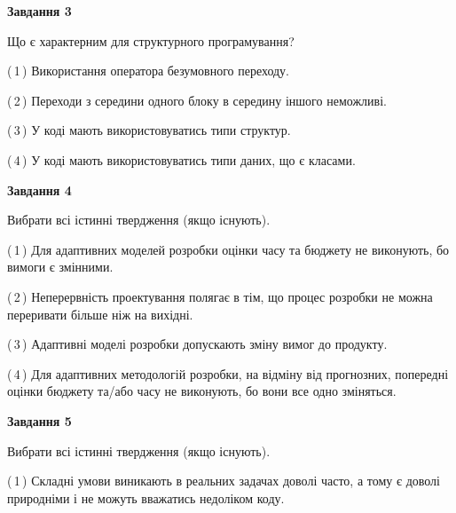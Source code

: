 \documentclass[10pt, ukrainian]{article}
\begin{document}
{\begin {large}
{\begin {center}\textbf{Завдання 3}\end {center}}\par
Що є характерним для структурного програмування?\par
\vspace{2mm}



(\,1\,) Використання оператора безумовного переходу. %



(\,2\,) Переходи з середини одного блоку в середину іншого неможливі. %



(\,3\,) У коді мають використовуватись типи структур. %



(\,4\,) У коді мають використовуватись типи даних, що є класами. %


{\begin {center}\textbf{Завдання 4}\end {center}}\par
Вибрати всі істинні твердження (якщо існують).\par
\vspace{2mm}



(\,1\,) Для адаптивних моделей розробки оцінки часу та бюджету не виконують, бо вимоги є змінними. %



(\,2\,) Неперервність проектування полягає в тім, що процес розробки не можна переривати більше ніж на вихідні. %



(\,3\,) Адаптивні моделі розробки допускають зміну вимог до продукту. %



(\,4\,) Для адаптивних методологій розробки, на відміну від прогнозних, попередні оцінки бюджету та/або часу не виконують, бо вони все одно зміняться. %


{\begin {center}\textbf{Завдання 5}\end {center}}\par
Вибрати всі істинні твердження (якщо існують).\par
\vspace{2mm}



(\,1\,) Складні умови виникають в реальних задачах доволі часто, а тому є доволі природніми і не можуть вважатись недоліком коду. %




\end{large}}
\end{document}
